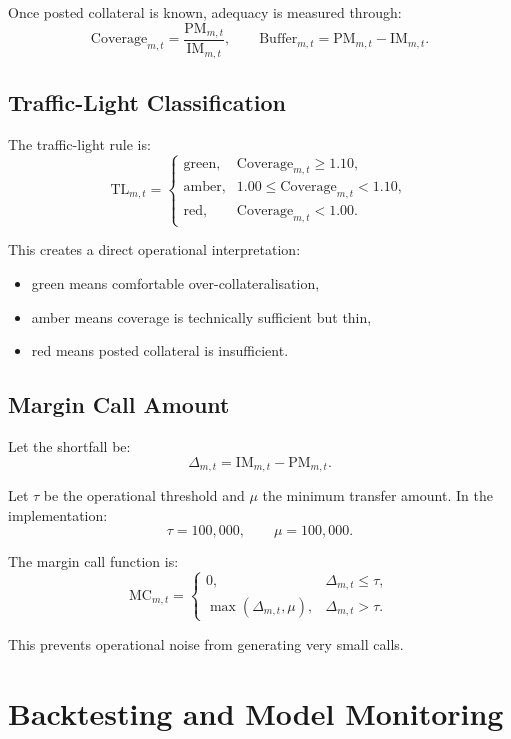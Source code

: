 \documentclass[11pt]{article}
\begin{document}
Once posted collateral is known, adequacy is measured through:
\[
\text{Coverage}_{m,t} = \frac{\text{PM}_{m,t}}{\text{IM}_{m,t}},
\qquad
\text{Buffer}_{m,t} = \text{PM}_{m,t} - \text{IM}_{m,t}.
\]

\subsection{Traffic-Light Classification}

The traffic-light rule is:
\[
\text{TL}_{m,t}
=
\begin{cases}
\text{green}, & \text{Coverage}_{m,t} \ge 1.10,\\
\text{amber}, & 1.00 \le \text{Coverage}_{m,t} < 1.10,\\
\text{red}, & \text{Coverage}_{m,t} < 1.00.
\end{cases}
\]

This creates a direct operational interpretation:

\begin{itemize}
    \item green means comfortable over-collateralisation,
    \item amber means coverage is technically sufficient but thin,
    \item red means posted collateral is insufficient.
\end{itemize}

\subsection{Margin Call Amount}

Let the shortfall be:
\[
\Delta_{m,t} = \text{IM}_{m,t} - \text{PM}_{m,t}.
\]

Let \(\tau\) be the operational threshold and \(\mu\) the minimum transfer amount. In the implementation:
\[
\tau = 100{,}000, \qquad \mu = 100{,}000.
\]

The margin call function is:
\[
\text{MC}_{m,t}
=
\begin{cases}
0, & \Delta_{m,t} \le \tau,\\
\max(\Delta_{m,t}, \mu), & \Delta_{m,t} > \tau.
\end{cases}
\]

This prevents operational noise from generating very small calls.

\section{Backtesting and Model Monitoring}
\end{document}

